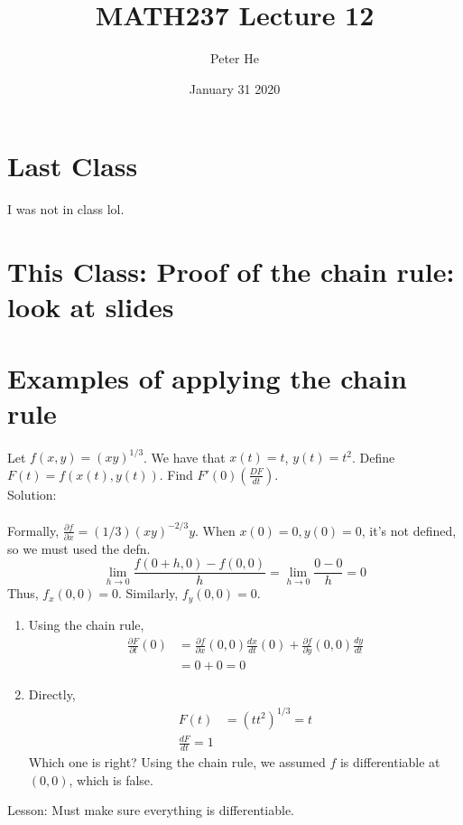 \documentclass[12pt]{article}
\title{MATH237 Lecture 12}
\author{Peter He}
\date{January 31 2020}
\theoremstyle{definition}
\begin{document}
\maketitle

\section{Last Class}
I was not in class lol.

\section{This Class: Proof of the chain rule: look at slides}

\section{Examples of applying the chain rule}
Let $f(x,y)=(xy)^{1/3}$. We have that $x(t)=t$, $y(t)=t^2$. Define $F(t)=f(x(t), y(t))$. Find $F'(0)(\frac{DF}{dt})$.\\
Solution:\\\\
Formally, $\frac{\partial f}{\partial x}=(1/3)(xy)^{-2/3}y$. When $x(0)=0, y(0)=0$, it's not defined, so we must used the defn.
\[\lim_{h\to 0}\frac{f(0 + h, 0)-f(0,0)}{h}=\lim_{h\to 0}\frac{0-0}{h}=0\]
Thus, $f_x(0,0)=0$. Similarly, $f_y(0,0)=0$. 
\begin{enumerate}
    \item Using the chain rule,\begin{align*}
    \frac{\partial F}{\partial t}(0)&=\frac{\partial f}{\partial x}(0,0)\frac{dx}{dt}(0)+\frac{\partial f}{\partial y}(0,0)\frac{dy}{dt}\\
    &=0+0=0\end{align*}
    \item Directly, \begin{align*}
    F(t)&=(tt^2)^{1/3}=t\\
    \frac{dF}{dt}=1
    \end{align*}
    Which one is right? Using the chain rule, we assumed $f$ is differentiable at $(0,0)$, which is false.
\end{enumerate}
Lesson: Must make sure everything is differentiable.
\end{document}
